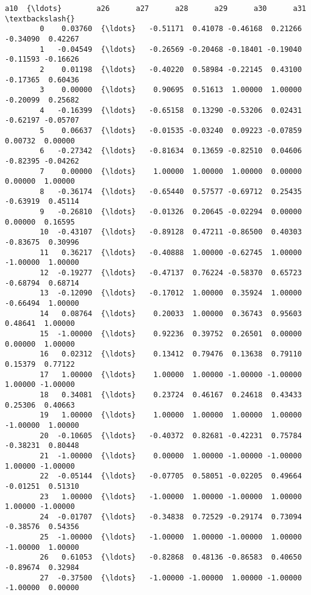 \documentclass[11pt]{article}
\begin{document}
\begin{Verbatim}[commandchars=\\\{\}]
                 a10  {\ldots}        a26      a27      a28      a29      a30      a31  \textbackslash{}
        0    0.03760  {\ldots}   -0.51171  0.41078 -0.46168  0.21266 -0.34090  0.42267   
        1   -0.04549  {\ldots}   -0.26569 -0.20468 -0.18401 -0.19040 -0.11593 -0.16626   
        2    0.01198  {\ldots}   -0.40220  0.58984 -0.22145  0.43100 -0.17365  0.60436   
        3    0.00000  {\ldots}    0.90695  0.51613  1.00000  1.00000 -0.20099  0.25682   
        4   -0.16399  {\ldots}   -0.65158  0.13290 -0.53206  0.02431 -0.62197 -0.05707   
        5    0.06637  {\ldots}   -0.01535 -0.03240  0.09223 -0.07859  0.00732  0.00000   
        6   -0.27342  {\ldots}   -0.81634  0.13659 -0.82510  0.04606 -0.82395 -0.04262   
        7    0.00000  {\ldots}    1.00000  1.00000  1.00000  0.00000  0.00000  1.00000   
        8   -0.36174  {\ldots}   -0.65440  0.57577 -0.69712  0.25435 -0.63919  0.45114   
        9   -0.26810  {\ldots}   -0.01326  0.20645 -0.02294  0.00000  0.00000  0.16595   
        10  -0.43107  {\ldots}   -0.89128  0.47211 -0.86500  0.40303 -0.83675  0.30996   
        11   0.36217  {\ldots}   -0.40888  1.00000 -0.62745  1.00000 -1.00000  1.00000   
        12  -0.19277  {\ldots}   -0.47137  0.76224 -0.58370  0.65723 -0.68794  0.68714   
        13  -0.12090  {\ldots}   -0.17012  1.00000  0.35924  1.00000 -0.66494  1.00000   
        14   0.08764  {\ldots}    0.20033  1.00000  0.36743  0.95603  0.48641  1.00000   
        15  -1.00000  {\ldots}    0.92236  0.39752  0.26501  0.00000  0.00000  1.00000   
        16   0.02312  {\ldots}    0.13412  0.79476  0.13638  0.79110  0.15379  0.77122   
        17   1.00000  {\ldots}    1.00000  1.00000 -1.00000 -1.00000  1.00000 -1.00000   
        18   0.34081  {\ldots}    0.23724  0.46167  0.24618  0.43433  0.25306  0.40663   
        19   1.00000  {\ldots}    1.00000  1.00000  1.00000  1.00000 -1.00000  1.00000   
        20  -0.10605  {\ldots}   -0.40372  0.82681 -0.42231  0.75784 -0.38231  0.80448   
        21  -1.00000  {\ldots}    0.00000  1.00000 -1.00000 -1.00000  1.00000 -1.00000   
        22  -0.05144  {\ldots}   -0.07705  0.58051 -0.02205  0.49664 -0.01251  0.51310   
        23   1.00000  {\ldots}   -1.00000  1.00000 -1.00000  1.00000  1.00000 -1.00000   
        24  -0.01707  {\ldots}   -0.34838  0.72529 -0.29174  0.73094 -0.38576  0.54356   
        25  -1.00000  {\ldots}   -1.00000  1.00000 -1.00000  1.00000 -1.00000  1.00000   
        26   0.61053  {\ldots}   -0.82868  0.48136 -0.86583  0.40650 -0.89674  0.32984   
        27  -0.37500  {\ldots}   -1.00000 -1.00000  1.00000 -1.00000 -1.00000  0.00000   

\end{Verbatim}
\end{document}
